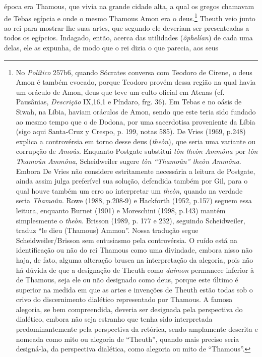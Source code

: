 época era Thamous, que vivia na grande cidade alta, a qual os gregos
chamavam de Tebas egípcia e onde o mesmo Thamous Amon era o
deus.\footnote{No \emph{Político} 257b6, quando Sócrates conversa com
  Teodoro de Cirene, o deus Amon é também evocado, porque Teodoro provém
  dessa região na qual havia um oráculo de Amon, deus que teve um culto
  oficial em Atenas (cf. Pausânias, \emph{Descrição} IX,16,1 e Píndaro,
  frg. 36). Em Tebas e no oásis de Siwah, na Líbia, haviam oráculos de
  Amon, sendo que este teria sido fundado ao mesmo tempo que o de
  Dodona, por uma sacerdotisa proveniente da Líbia (sigo aqui Santa-Cruz
  y Crespo, p. 199, notas 585). De Vries (1969, p.248) explica a
  controvérsia em torno desse deus (\emph{theòn})\emph{,} que seria uma
  variante ou corrupção de \emph{Amoûs}. Enquanto Postgate substitui
  \emph{tòn theòn Ammôna} por \emph{tòn Thamoûn Ammôna}, Scheidweiler
  sugere \emph{tòn ``Thamoûn'' theòn Ammôna}. Embora De Vries não
  considere estritamente necessária a leitura de Postgate, ainda assim
  julga preferível sua solução, defendida também por Gil, para o qual
  houve também um erro ao interpretar um \emph{theòn}, quando na verdade
  seria \emph{Thamoûn}. Rowe (1988, p.208-9) e Hackforth (1952, p.157)
  seguem essa leitura, enquanto Burnet (1901) e Moreschini (1998, p.143)
  mantém simplesmente o \emph{theòn}. Brisson (1989, p. 177 e 232),
  seguindo Scheidweiler, traduz ``le dieu (Thamous) Ammon''. Nossa
  tradução segue Scheidweiler/Brisson sem entusiasmo pela controvérsia.
  O ruído está na identificação ou não do rei Thamous como uma
  divindade, embora nisso não haja, de fato, alguma alteração brusca na
  interpretação da alegoria, pois não há dúvida de que a designação de
  Theuth como \emph{daímon} permanece inferior à de Thamous, seja ele ou
  não designado como deus, porque este último é superior na medida em
  que as artes e invenções de Theuth estão todas sob o crivo do
  discernimento dialético representado por Thamous. A famosa alegoria,
  se bem compreendida, deveria ser designada pela perspectiva do
  dialético, embora não seja estranho que tenha sido interpretada
  predominantemente pela perspectiva da retórica, sendo amplamente
  descrita e nomeada como mito ou alegoria de ``Theuth'', quando mais
  preciso seria designá-la, da perspectiva dialética, como alegoria ou
  mito de ``Thamous''.} Theuth veio junto ao rei para mostrar-lhe suas
artes, que segundo ele deveriam ser presenteadas a todos os egípcios.
Indagado, então, acerca das utilidades (\emph{ôphelían}) de cada uma
delas, ele as expunha, de modo que o rei dizia o que parecia, aos seus
